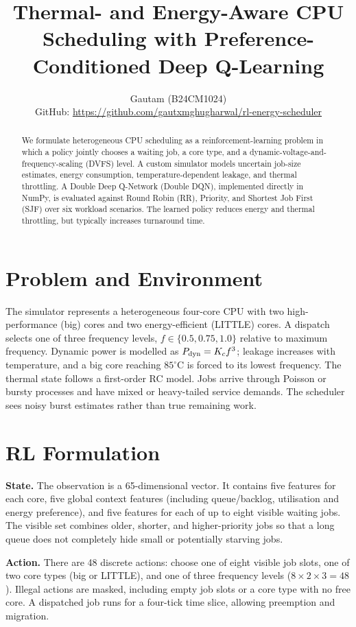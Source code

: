 \documentclass[9pt,twocolumn]{article}
\title{\vspace{-1.1em}\textbf{Thermal- and Energy-Aware CPU Scheduling with Preference-Conditioned Deep Q-Learning}\vspace{-0.6em}}
\author{Gautam (B24CM1024)\\[-1pt]\small GitHub: \url{https://github.com/gautxmghugharwal/rl-energy-scheduler}}
\date{}
\begin{document}
\maketitle
\vspace{-2.0em}

\begin{abstract}
We formulate heterogeneous CPU scheduling as a reinforcement-learning problem in which a policy jointly chooses a waiting job, a core type, and a dynamic-voltage-and-frequency-scaling (DVFS) level. A custom simulator models uncertain job-size estimates, energy consumption, temperature-dependent leakage, and thermal throttling. A Double Deep Q-Network (Double DQN), implemented directly in NumPy, is evaluated against Round Robin (RR), Priority, and Shortest Job First (SJF) over six workload scenarios. The learned policy reduces energy and thermal throttling, but typically increases turnaround time.
\end{abstract}

\section{Problem and Environment}
The simulator represents a heterogeneous four-core CPU with two high-performance (big) cores and two energy-efficient (LITTLE) cores. A dispatch selects one of three frequency levels, $f\in\{0.5,0.75,1.0\}$ relative to maximum frequency. Dynamic power is modelled as $P_{\rm dyn}=K_cf^3$; leakage increases with temperature, and a big core reaching $85^\circ$C is forced to its lowest frequency. The thermal state follows a first-order RC model. Jobs arrive through Poisson or bursty processes and have mixed or heavy-tailed service demands. The scheduler sees noisy burst estimates rather than true remaining work.

\section{RL Formulation}
\textbf{State.} The observation is a 65-dimensional vector. It contains five features for each core, five global context features (including queue/backlog, utilisation and energy preference), and five features for each of up to eight visible waiting jobs. The visible set combines older, shorter, and higher-priority jobs so that a long queue does not completely hide small or potentially starving jobs.

\textbf{Action.} There are 48 discrete actions: choose one of eight visible job slots, one of two core types (big or LITTLE), and one of three frequency levels ($8\times2\times3=48$). Illegal actions are masked, including empty job slots or a core type with no free core. A dispatched job runs for a four-tick time slice, allowing preemption and migration.
\end{document}
